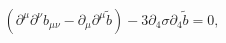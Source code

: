 \begin{equation}\label{4-4-1}
(\partial^\mu \partial^\nu  b_{\mu\nu} - \partial_\mu
\partial^\mu \tilde b) - 3\partial_4 \sigma \partial_4 \tilde b =0,
\end{equation}

